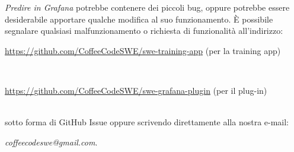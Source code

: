\documentclass[../manuale-utente.tex]{subfiles}
\begin{document}
\textit{Predire in Grafana} potrebbe contenere dei piccoli bug, oppure potrebbe essere desiderabile apportare qualche modifica al suo funzionamento. È possibile segnalare qualsiasi malfunzionamento o richiesta di funzionalità all’indirizzo: \\
\newline
\centerline{\url{https://github.com/CoffeeCodeSWE/swe-training-app} (per la training app)} \\
\centerline{\url{https://github.com/CoffeeCodeSWE/swe-grafana-plugin} (per il plug-in)} \\
\newline
sotto forma di GitHub Issue oppure scrivendo direttamente alla nostra e-mail: \\
\newline
\centerline{\textit{coffeecodeswe@gmail.com}.} \\
\end{document}
